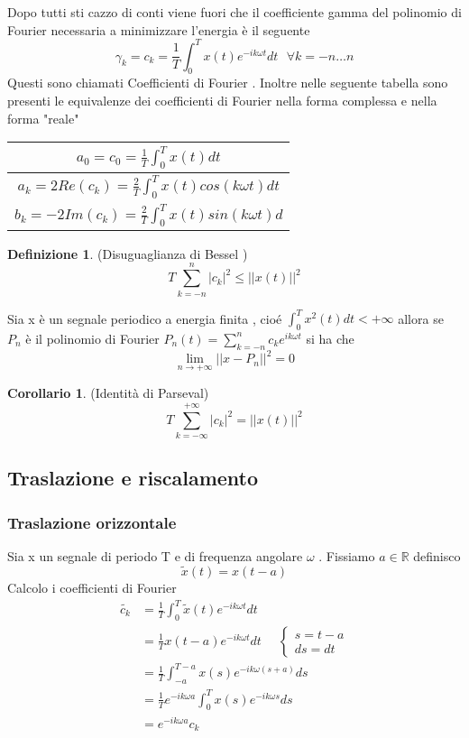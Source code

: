 \documentclass{article}
\theoremstyle{definition}
\newtheorem*{definizione}{Definizione}
\newtheorem*{corollario}{Corollario}
\newcommand{\R}{\mathbb{R}}
\newcommand{\eckm}{e^{-ik\omega t}}
\newcommand{\inT}{\int_{0}^{T} }
\begin{document}
Dopo tutti sti cazzo di conti viene fuori che il coefficiente gamma del polinomio di Fourier necessaria a minimizzare l'energia è il seguente 
$$\gamma_{k}= c_k=\frac{1}{T}\inT x(t) e^{-ik\omega t}dt \ \ \ \forall k=-n \dots n $$
Questi sono chiamati Coefficienti di Fourier . \newpage
Inoltre nelle seguente tabella sono presenti le equivalenze dei coefficienti di Fourier nella forma complessa e nella forma "reale"  
\begin{center}
\begin{tabular}{||c||}
	\hline
	$a_0=c_0=\frac{1}{T}\inT x(t) dt$
	\rule[-1ex]{0pt}{2.5ex}  \\
	\hline
	$a_k=2Re(c_k)=\frac{2}{T}\inT x(t)cos(k\omega t) dt$
	\rule[-1ex]{0pt}{2.5ex}  \\
	\hline
	$b_k=-2Im(c_k)=\frac{2}{T}\inT x(t)sin(k\omega t) d$
	\rule[-1ex]{0pt}{2.5ex}  \\
	\hline
\end{tabular}
\end{center}
\begin{definizione}(Disuguaglianza di Bessel )
	 $$T\sum_{k=-n}^{n} |c_k|^2\leq ||x(t)||^2$$
\end{definizione}
\begin{teo}{}{}
	Sia x è un segnale periodico a energia finita , cioé $\int_{0}^{T}x^2(t)dt < + \infty $ allora se $P_n$ è il polinomio di Fourier $P_n(t)=\sum_{k=-n}^n c_ke^{ik\omega t}  $ si ha che 
	$$\lim_{n \rightarrow +\infty} ||x-P_n||^2=0$$ 
\end{teo}
\begin{corollario}(Identità di Parseval)
	 $$T\sum_{k=-\infty}^{+\infty} |c_k|^2=||x(t)||^2$$
\end{corollario}
\subsection{Traslazione e riscalamento}
\subsubsection{Traslazione orizzontale}
Sia x un segnale di periodo T e di frequenza angolare $ \omega$ . Fissiamo $ a \in \R$ definisco 
$$\tilde{x}(t)=x(t-a)$$ 
Calcolo i coefficienti di Fourier 
\begin{align*}
\tilde{c_k}&= \frac{1}{T} \int_{0}^{T}\tilde{x}(t)\eckm dt\\
&=\frac{1}{T}x(t-a)\eckm   dt  \ \ \ \ \ \ \begin{cases}
	s=t-a \\
	ds=dt 
\end{cases} \\
&=\frac{1}{T}\int_{-a}^{T-a} x(s)e^{-ik\omega (s+a)}ds\\
&=\frac{1}{T} e^{-ik\omega a } \inT x(s)e^{-ik\omega s}ds\\
&= e^{-ik\omega a } c_k
\end{align*} 
\end{document}
